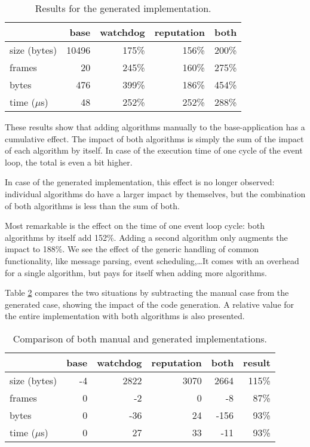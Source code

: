 \documentclass[conference]{IEEEtran}
\begin{document}
\begin{table}[H]
  \centering
  \begin{tabular}{lrrrr}
  \hline
         & base & watchdog & reputation & both\\
  \hline
  size (bytes) & 10496 & 175\% & 156\% & 200\%\\
  frames & 20 & 245\% & 160\% & 275\%\\
  bytes & 476 & 399\% & 186\% & 454\%\\
  time ($\mu$s) & 48 & 252\% & 252\% & 288\%\\
  \hline
  \end{tabular}
  \caption{Results for the generated implementation.}
  \label{tbl:generated}
\end{table}

These results show that adding algorithms manually to the base-application has
a cumulative effect. The impact of both algorithms is simply the sum of the
impact of each algorithm by itself. In case of the execution time of one cycle
of the event loop, the total is even a bit higher.

In case of the generated implementation, this effect is no longer observed:
individual algorithms do have a larger impact by themselves, but the
combination of both algorithms is less than the sum of both.

Most remarkable is the effect on the time of one event loop cycle: both
algorithms by itself add 152\%. Adding a second algorithm only augments the
impact to 188\%. We see the effect of the generic handling of common
functionality, like message parsing, event scheduling,\dots It comes with an
overhead for a single algorithm, but pays for itself when adding more
algorithms.

Table \ref{tbl:summary} compares the two situations by subtracting the manual
case from the generated case, showing the impact of the code generation. A
relative value for the entire implementation with both algorithms is also
presented.

\begin{table}[H]
  \centering
  \begin{tabular}{lrrrrr}
  \hline
                & base & watchdog & reputation & both  & result \\
  \hline
  size (bytes)  & -4    & 2822     & 3070       & 2664  & 115\%  \\
  frames        & 0     & -2       & 0          & -8    & 87\%   \\
  bytes         & 0     & -36      & 24         & -156  & 93\%   \\
  time ($\mu$s) & 0     & 27       & 33         & -11   & 93\%   \\
  \hline
  \end{tabular}
  \caption{Comparison of both manual and generated implementations.}
  \label{tbl:summary}
\end{table}
\end{document}
